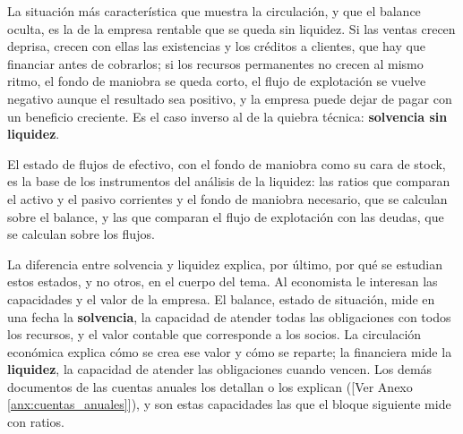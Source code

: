 \documentclass[10pt,a4paper]{article}
\newcommand{\authorfont}[1]{{\fontfamily{EBGaramond-TLF}\selectfont #1}}
\begin{document}
La situación más característica que muestra la circulación, y que el balance oculta, es la de la empresa rentable que se queda sin liquidez. Si las ventas crecen deprisa, crecen con ellas las existencias y los créditos a clientes, que hay que financiar antes de cobrarlos; si los recursos permanentes no crecen al mismo ritmo, el fondo de maniobra se queda corto, el flujo de explotación se vuelve negativo aunque el resultado sea positivo, y la empresa puede dejar de pagar con un beneficio creciente. Es el caso inverso al de la quiebra técnica: \textbf{solvencia sin liquidez}.

El estado de flujos de efectivo, con el fondo de maniobra como su cara de stock, es la base de los instrumentos del análisis de la liquidez: las ratios que comparan el activo y el pasivo corrientes y el fondo de maniobra necesario, que se calculan sobre el balance, y las que comparan el flujo de explotación con las deudas, que se calculan sobre los flujos.

La diferencia entre solvencia y liquidez explica, por último, por qué se estudian estos estados, y no otros, en el cuerpo del tema. Al economista le interesan las capacidades y el valor de la empresa. El balance, estado de situación, mide en una fecha la \textbf{solvencia}, la capacidad de atender todas las obligaciones con todos los recursos, y el valor contable que corresponde a los socios. La circulación económica explica cómo se crea ese valor y cómo se reparte; la financiera mide la \textbf{liquidez}, la capacidad de atender las obligaciones cuando vencen. Los demás documentos de las cuentas anuales los detallan o los explican ([\authorfont{Ver Anexo \ref{anx:cuentas_anuales}}]), y son estas capacidades las que el bloque siguiente mide con ratios.



























\clearpage
\end{document}
